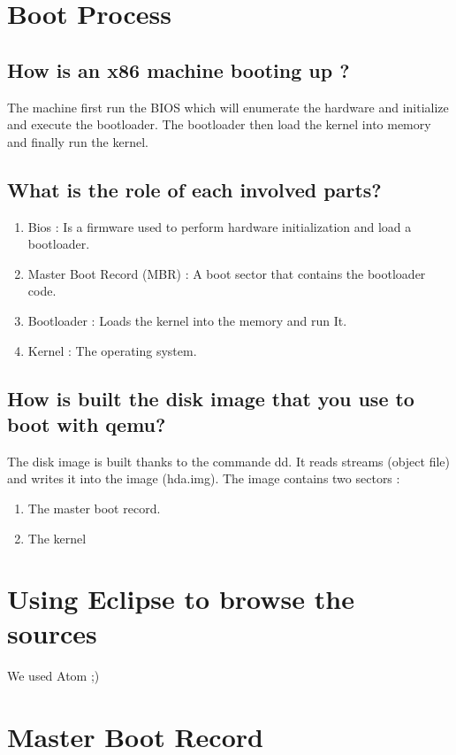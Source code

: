 \documentclass[10]{article}
\begin{document}
\section{Boot Process}

\subsection{How is an x86 machine booting up ? }
The machine first run the BIOS which will enumerate the hardware and initialize and execute the bootloader. The bootloader then load the kernel into memory and finally run the kernel.

\subsection{What is the role of each involved parts?}
\begin{enumerate}
	\item 
	Bios : Is a firmware used to perform hardware initialization and load a bootloader.
	\item 
	Master Boot Record (MBR) : A boot sector that contains the bootloader code.
	\item 
	Bootloader : Loads the kernel into the memory and run It.
	\item 
	Kernel : The operating system.
\end{enumerate}
\subsection{How is built the disk image that you use to boot with qemu?}
The disk image is built thanks to the commande dd. It reads streams (object file) and writes it into the image (hda.img). 
The image contains two sectors :
\begin{enumerate}
	\item
	The master boot record.
	\item 
	The kernel 
\end{enumerate}

\section{Using Eclipse to browse the sources}

We used Atom ;)

\section{Master Boot Record}
\end{document}

